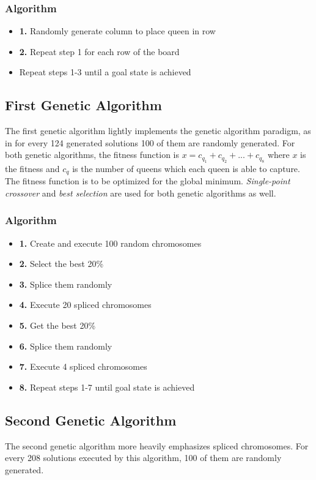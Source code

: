 \documentclass[a4paper]{article}
\begin{document}
\subsubsection{Algorithm}

\begin{itemize}
    \item \textbf{1.} Randomly generate column to place queen in row
    \item \textbf{2.} Repeat step 1 for each row of the board
    \item {} Repeat steps 1-3 until a goal state is achieved
\end{itemize}

\subsection{First Genetic Algorithm}
The first genetic algorithm lightly implements the genetic algorithm paradigm, as in for every 124 generated solutions 100 of them are randomly generated. For both genetic algorithms, the fitness function is $x = c_q_1 + c_q_2 + ... + c_q_8$ where $x$ is the fitness and $c_q$ is the number of queens which each queen is able to capture. The fitness function is to be optimized for the global minimum. \textit{Single-point crossover} and  \textit{best selection} are used for both genetic algorithms as well.\\

\subsubsection{Algorithm}

\begin{itemize}
    \item \textbf{1.} Create and execute 100 random chromosomes
    \item \textbf{2.} Select the best 20\%
    \item \textbf{3.} Splice them randomly
    \item \textbf{4.} Execute 20 spliced chromosomes
    \item \textbf{5.} Get the best 20\%
    \item \textbf{6.} Splice them randomly
    \item \textbf{7.} Execute 4 spliced chromosomes
    \item \textbf{8.} Repeat steps 1-7 until goal state is achieved
\end{itemize}

\subsection{Second Genetic Algorithm}
The second genetic algorithm more heavily emphasizes spliced chromosomes. For every 208 solutions executed by this algorithm, 100 of them are randomly generated.
\end{document}
